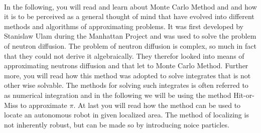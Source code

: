 \documentclass[../SRP.tex]{subfiles}
\begin{document}
\begin{titlepage}
  \begin{center}
  \begin{minipage}{0.8\textwidth}
    \\
    \justify
    In the following, you will read and learn about Monte Carlo Method and and how it is to be perceived as a general thought of mind that have evolved into different methods and algorithms of approximating problems. It was first developed by Stanislaw Ulam during the Manhattan Project and was used to solve the problem of neutron diffusion. The problem of neutron diffusion is complex, so much in fact that they could not derive it algebraically. They therefor looked into means of approximating neutrons diffusion and that let to Monte Carlo Method. Further more, you will read how this method was adopted to solve integrates that is not other wise solvable. The methods for solving such integrates is often referred to as numerical integration and in the following we will be using the method Hit-or-Miss to approximate $\pi$. At last you will read how the method can be used to locate an autonomous robot in given localized area. The method of localizing is not inherently robust, but can be made so by introducing noice particles. 
  \end{minipage}
  \end{center}
\end{titlepage}
\end{document}
